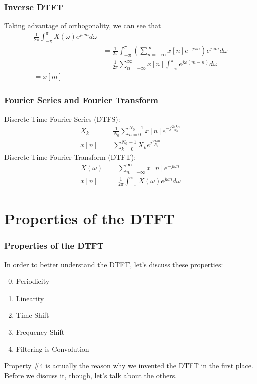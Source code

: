 \documentclass{beamer}
\begin{document}
\begin{frame}
  \frametitle{Inverse DTFT}

  Taking advantage of orthogonality, we can see that
  \begin{align*}
    \frac{1}{2\pi}\int_{-\pi}^\pi X(\omega)e^{j\omega m}d\omega\\
    &=\frac{1}{2\pi}\int_{-\pi}^{\pi}
    \left(\sum_{n=-\infty}^\infty x[n]e^{-j\omega n}\right)e^{j\omega m}d\omega\\
    &=\frac{1}{2\pi}\sum_{n=-\infty}^\infty x[n]\int_{-\pi}^\pi e^{j\omega(m-n)}d\omega\\
    = x[m]
  \end{align*}
\end{frame}

  
\begin{frame}
  \frametitle{Fourier Series and Fourier Transform}
  Discrete-Time Fourier Series (DTFS):
  \begin{align*}
    X_k &= \frac{1}{N_0}\sum_{n=0}^{N_0-1} x[n] e^{-j\frac{2\pi kn}{N_0}}\\
    x[n] &= \sum_{k=0}^{N_0-1} X_ke^{j\frac{2\pi kn}{N_0}}
  \end{align*}
  Discrete-Time Fourier Transform (DTFT):
  \begin{align*}
    X(\omega) &= \sum_{n=-\infty}^{\infty} x[n] e^{-j\omega n}\\
    x[n] &= \frac{1}{2\pi}\int_{-\pi}^\pi X(\omega)e^{j\omega n}d\omega
  \end{align*}
  
\end{frame}
  
\section[DTFT Properties]{Properties of the DTFT}
\setcounter{subsection}{1}

\begin{frame}
  \frametitle{Properties of the DTFT}

  In order to better understand the DTFT, let's discuss these properties:
  \begin{enumerate}
    \setcounter{enumi}{-1}
  \item Periodicity
  \item Linearity
  \item Time Shift
  \item Frequency Shift
  \item Filtering is Convolution
  \end{enumerate}
  Property \#4 is actually the reason why we invented the DTFT in the first place.
  Before we discuss it, though, let's talk about the others.
\end{frame}
\end{document}
